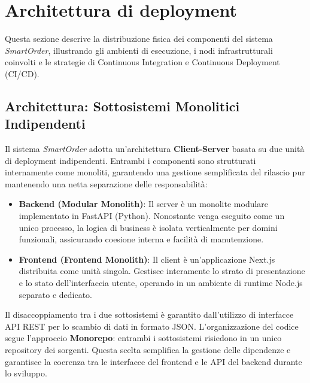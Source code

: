 \documentclass[a4paper, 11pt, oneside]{scrartcl}
\begin{document}
\section{Architettura di deployment}

Questa sezione descrive la distribuzione fisica dei componenti del sistema \textit{SmartOrder}, illustrando gli ambienti di esecuzione, i nodi
     infrastrutturali coinvolti e le strategie di Continuous Integration e Continuous Deployment (CI/CD).

\subsection{Architettura: Sottosistemi Monolitici Indipendenti}
Il sistema \textit{SmartOrder} adotta un'architettura \textbf{Client-Server} basata su due unità di deployment indipendenti. Entrambi i componenti
      sono strutturati internamente come monoliti, garantendo una gestione semplificata del rilascio pur mantenendo una netta separazione delle
      responsabilità:

\begin{itemize}
    \item \textbf{Backend (Modular Monolith)}: Il server è un monolite modulare implementato in FastAPI (Python). Nonostante venga eseguito come un
      unico processo, la logica di business è isolata verticalmente per domini funzionali, assicurando coesione interna e facilità di manutenzione.
    \item \textbf{Frontend (Frontend Monolith)}: Il client è un'applicazione Next.js distribuita come unità singola. Gestisce interamente lo strato
      di presentazione e lo stato dell'interfaccia utente, operando in un ambiente di runtime Node.js separato e dedicato.
\end{itemize}
Il disaccoppiamento tra i due sottosistemi è garantito dall'utilizzo di interfacce API REST per lo scambio di dati in formato JSON.
L'organizzazione del codice segue l'approccio \textbf{Monorepo}: entrambi i sottosistemi risiedono in un unico repository dei sorgenti. Questa
scelta semplifica la gestione delle dipendenze e garantisce la coerenza tra le interfacce del frontend e le API del backend durante lo sviluppo.
\end{document}
